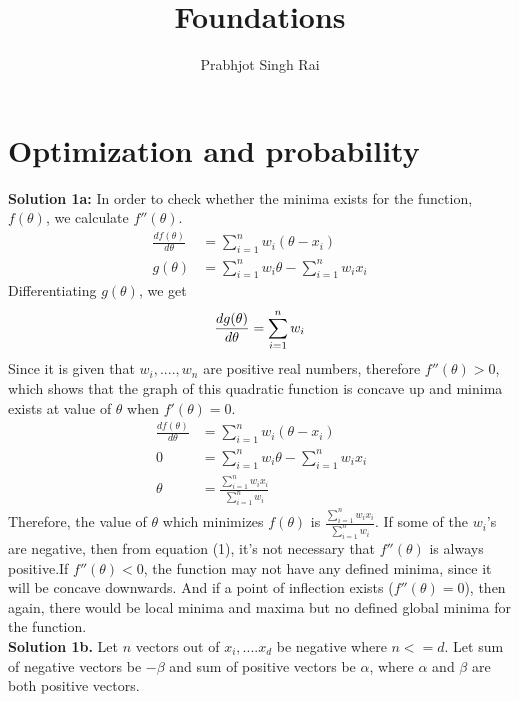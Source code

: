 \documentclass[11pt]{article}
\begin{document}
\title{Foundations}
\author{Prabhjot Singh Rai}
\maketitle

\section{Optimization and probability}

\textbf{Solution 1a:} In order to check whether the minima exists for the function, $f(\theta)$, we calculate $f''(\theta)$.
\begin{equation*}
\begin{split}
\frac{df(\theta)}{d\theta} & = \sum_{i=1}^{n} w_i(\theta - x_i)\\
g(\theta)& = \sum_{i=1}^{n} w_i \theta - \sum_{i=1}^{n} w_i x_i
\end{split}
\end{equation*}
Differentiating $g(\theta)$, we get
\begin{equation}
\frac{dg(\theta)}{d\theta} = \sum_{i=1}^{n} w_i \\
\end{equation}
Since it is given that $w_i, ...., w_n$ are positive real numbers, therefore $f''(\theta) > 0$, which shows that the graph of this quadratic function is concave up and minima exists at value of $\theta$ when $f'(\theta) = 0$.
\begin{equation*}\
\begin{split}
\frac{df(\theta)}{d\theta} & =  \sum_{i=1}^{n} w_i(\theta - x_i)\\
0 & = \sum_{i=1}^{n} w_i \theta - \sum_{i=1}^{n} w_i x_i\\
\theta & = \frac{\sum_{i=1}^{n} w_i x_i}{\sum_{i=1}^{n} w_i}
\end{split}
\end{equation*}
Therefore, the value of $\theta$ which minimizes $f(\theta)$ is $ \frac{\sum_{i=1}^{n} w_i x_i}{\sum_{i=1}^{n} w_i}$.
If some of the $w_i$'s are negative, then from equation (1), it's not necessary that $f''(\theta)$ is always positive.If $f''(\theta)<0$, the function may not have any defined minima, since it will be concave downwards. And if a point of inflection exists ($f''(\theta) = 0$), then again, there would be local minima and maxima but no defined global minima for the function. \\
\linebreak
\textbf{Solution 1b.} Let $n$ vectors out of $x_i, .... x_d$ be negative where $n <= d$. Let sum of negative vectors be $-\beta$ and sum of positive vectors be $\alpha$, where $\alpha$ and $\beta$ are both positive vectors.
\end{document}
